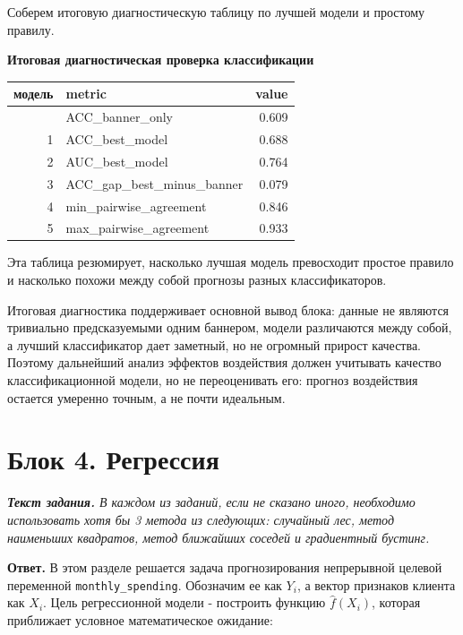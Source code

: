 \documentclass[11pt]{article}
\newcounter{none}
\newenvironment{tasktext}
      {\begin{tcolorbox}[breakable, colback=black!3, colframe=black!28,
        boxrule=0.4pt, arc=1.5mm, left=7pt, right=7pt, top=5pt, bottom=5pt,
        before skip=0.35em, after skip=0.75em]\itshape}
      {\end{tcolorbox}}
\begin{document}
    Соберем итоговую диагностическую таблицу по лучшей модели и простому
правилу.

    \textbf{Итоговая диагностическая проверка классификации}

{\def\LTcaptype{none} %
\begin{longtable}[]{@{}rlr@{}}
\toprule\noalign{}
модель & metric & value \\
\midrule\noalign{}
\endhead
\bottomrule\noalign{}
\endlastfoot
0 & ACC\_banner\_only & 0.609 \\
1 & ACC\_best\_model & 0.688 \\
2 & AUC\_best\_model & 0.764 \\
3 & ACC\_gap\_best\_minus\_banner & 0.079 \\
4 & min\_pairwise\_agreement & 0.846 \\
5 & max\_pairwise\_agreement & 0.933 \\
\end{longtable}
}

    Эта таблица резюмирует, насколько лучшая модель превосходит простое
правило и насколько похожи между собой прогнозы разных классификаторов.

Итоговая диагностика поддерживает основной вывод блока: данные не
являются тривиально предсказуемыми одним баннером, модели различаются
между собой, а лучший классификатор дает заметный, но не огромный
прирост качества. Поэтому дальнейший анализ эффектов воздействия должен
учитывать качество классификационной модели, но не переоценивать его:
прогноз воздействия остается умеренно точным, а не почти идеальным.

    \section{Блок 4.
Регрессия}\label{ux431ux43bux43eux43a-4.-ux440ux435ux433ux440ux435ux441ux441ux438ux44f}

\begin{tasktext}
\textbf{Текст задания.} В каждом из заданий, если не сказано иного,
необходимо использовать хотя бы 3 метода из следующих: случайный лес,
метод наименьших квадратов, метод ближайших соседей и градиентный
бустинг.
\end{tasktext}

\textbf{Ответ.} В этом разделе решается задача прогнозирования
непрерывной целевой переменной \texttt{monthly\_spending}. Обозначим ее
как \(Y_i\), а вектор признаков клиента как \(X_i\). Цель регрессионной
модели - построить функцию \(\hat f(X_i)\), которая приближает условное
математическое ожидание:
\end{document}
